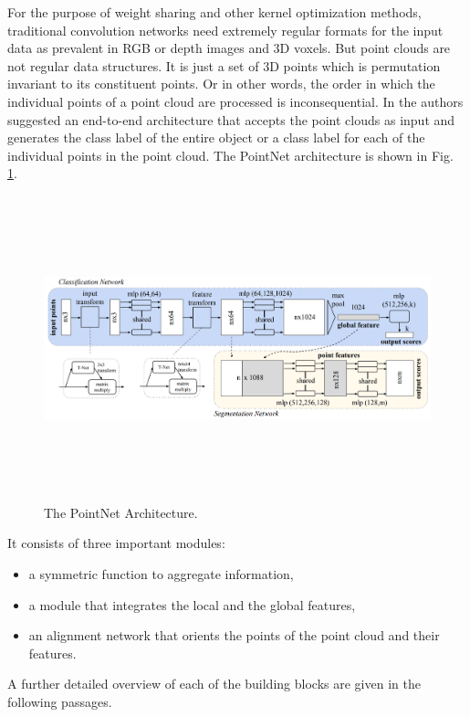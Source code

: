 For the purpose of weight sharing and other kernel optimization methods, traditional convolution networks need extremely regular formats for the input data as prevalent in \ac{RGB} or depth images and 3D voxels. But point clouds are not regular data structures. It is just a set of 3D points which is permutation invariant to its constituent points. Or in other words, the order in which the individual points of a point cloud are processed is inconsequential. In \cite{qi2017pointnet} the authors suggested an end-to-end architecture that accepts the point clouds as input and generates the class label of the entire object or a class label for each of the individual points in the point cloud. The PointNet architecture is shown in Fig. \ref{fig:pointnet_arch}.
\begin{figure}[t]
    \centering
    \includegraphics[width=400pt,height=250pt]{pictures/PointNet.png}
    \caption{The PointNet Architecture.\cite{qi2017pointnet}}
    \label{fig:pointnet_arch}
\end{figure}
It consists of three important modules:
\begin{itemize}
    \item a symmetric function to aggregate information, 
    \item a module that integrates the local and the global features, 
    \item an alignment network that orients the points of the point cloud and their features. 
\end{itemize}
A further detailed overview of each of the building blocks are given in the following passages.

\vspace{5mm}

